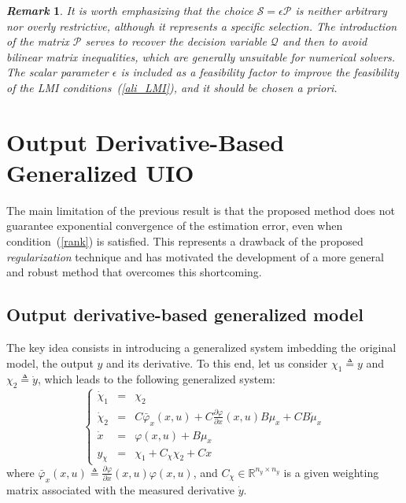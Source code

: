 \documentclass{ifacconf}
\def\eqref#1{(\ref{#1})}
\newtheorem{remark}{\it \textbf{Remark}}%
\begin{document}
%


\begin{remark}
It is worth emphasizing that the choice $\mathcal{S} = \epsilon \mathcal{P}$ is neither arbitrary nor overly restrictive, although it represents a specific selection. The introduction of the matrix $\mathcal{P}$ serves to recover the decision variable $\mathcal{Q}$ and then to avoid bilinear matrix inequalities, which are generally unsuitable for numerical solvers. The scalar parameter $\epsilon$ is included as a {\it feasibility factor} to improve the feasibility of the LMI conditions~\eqref{ali_LMI}, and it should be chosen a priori.
\end{remark}





{\color{black}
\section{Output Derivative-Based Generalized UIO}\label{output_derivative}
The main limitation of the previous result is that the proposed method does not guarantee exponential convergence of the estimation error, even when condition~\eqref{rank} is satisfied. This represents a drawback of the proposed {\it regularization} technique and has motivated the development of a more general and robust method that overcomes this shortcoming.

\subsection{Output derivative-based generalized model}\label{output_derivative_model}
The key idea consists in introducing a generalized system imbedding the original model, the output $y$ and its derivative. To this end, let us consider $\chi_{1} \triangleq y$ and $\chi_{2} \triangleq \dot{y}$, which leads to the following generalized system:
\begin{equation}\label{ali_syst3_e1}
\left\{
\begin{array}{rcl}
\dot{\chi}_{1} & = & \chi_{2} 
\\
\dot{\chi}_{2} & = & C  \bar{\varphi}_{x}(x,u)  + C \frac{\partial \varphi}{\partial x}(x,u) B \mu_{x} + CB \dot{\mu}_{x}
\\ 
\dot{x} & = &  \varphi(x,u) + B \mu_{x} \\
y_{\chi} & = &  \chi_{1} + C_{\chi} \chi_{2} + C x
\end{array}
\right.
\end{equation}
where $\bar{\varphi}_{x}(x,u) \triangleq \frac{\partial \varphi}{\partial x}(x,u) \varphi(x,u)$, and $C_{\chi} \in\mathbb{R}^{n_y\times n_y}$ is a given weighting matrix associated with the measured derivative $\dot{y}$.

}
\end{document}
